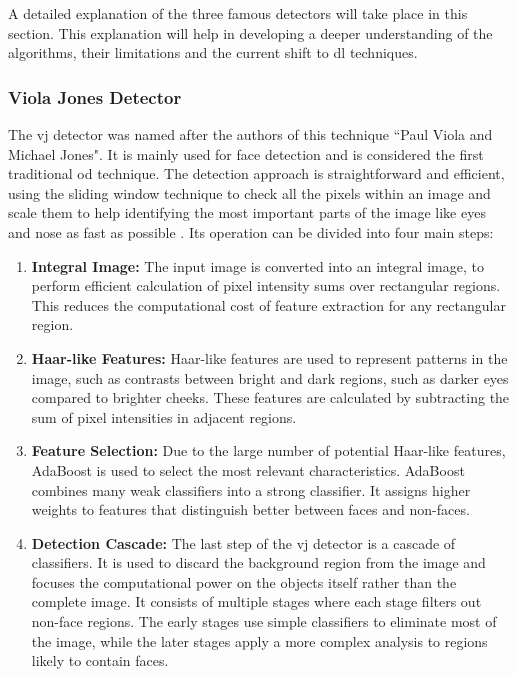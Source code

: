 A detailed explanation of the three famous detectors will take place in this section. This explanation will help in developing a deeper understanding of the algorithms, their limitations and the current shift to \gls{dl} techniques.

\subsubsection{Viola Jones Detector}
The \gls{vj} detector was named after the authors of this technique “Paul Viola and Michael Jones". It is mainly used for face detection and is considered the first traditional \gls{od} technique. The detection approach is straightforward and efficient, using the sliding window technique to check all the pixels within an image and scale them to help identifying the most important parts of the image like eyes and nose as fast as possible \cite{oD_Review}. Its operation can be divided into four main steps:

\begin{enumerate}
    \item \textbf{Integral Image:}
    The input image is converted into an integral image, to perform efficient calculation of pixel intensity sums over rectangular regions. This reduces the computational cost of feature extraction for any rectangular region.
    
    \item \textbf{Haar-like Features:}  
    Haar-like features are used to represent patterns in the image, such as contrasts between bright and dark regions, such as darker eyes compared to brighter cheeks. These features are calculated by subtracting the sum of pixel intensities in adjacent regions.
    
    \item \textbf{Feature Selection:}  
    Due to the large number of potential Haar-like features, AdaBoost is used to select the most relevant characteristics. AdaBoost combines many weak classifiers into a strong classifier. It assigns higher weights to features that distinguish better between faces and non-faces.

    \item \textbf{Detection Cascade:}  
    The last step of the \gls{vj} detector is a cascade of classifiers. It is used to discard the background region from the image and focuses the computational power on the objects itself rather than the complete image. It consists of multiple stages where each stage filters out non-face regions. The early stages use simple classifiers to eliminate most of the image, while the later stages apply a more complex analysis to regions likely to contain faces.

\end{enumerate}

